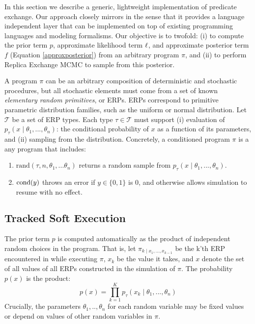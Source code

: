 
In this section we describe a generic, lightweight implementation of predicate exchange.
Our approach closely mirrors \citep{wingate2011lightweight, milch20071} in the sense that it provides a language independent layer that can be implemented on top of existing programming languages and modeling formalisms.
Our objective is to twofold: (i) to compute the prior term $p$, approximate likelihood term $\operatorname{\ell}$, and approximate posterior term $f$ (Equation \ref{approxposterior}) from an arbitrary program $\pi$, and (ii) to perform Replica Exchange MCMC to sample from this posterior.

A program $\pi$ can be an arbitrary composition of deterministic and stochastic procedures, but all stochastic elements must come from a set of known \emph{elementary random primitives}, or ERPs.
ERPs correspond to primitive parametric distribution families, such as the uniform or normal distribution.
Let $\mathcal{T}$ be a set of ERP types.
Each type $\tau \in \mathcal{T}$ must support (i) evaluation of $p_\tau(x \mid \theta_1, ..., \theta_n)$: the conditional probability of $x$ as a function of its parameters, and (ii) sampling from the distribution.
Concretely, a conditioned program $\pi$ is a any program that includes:

\begin{enumerate}
  \item $\textrm{rand}(\tau, n, \theta_1, ...\theta_n)$ returns a random sample from $p_\tau(x \mid \theta_1, ..., \theta_n)$.
  \item $\operatorname{cond}(y)$ throws an error if $y \in \{0, 1\}$ is 0, and otherwise allows simulation to resume with no effect.
\end{enumerate}



\subsection{Tracked Soft Execution}
The prior term $p$ is computed automatically as the product of independent random choices in the program. 
That is, let $\pi_{k \mid x_1, ..., x_{k-1}}$ be the k'th ERP encountered in while executing $\pi$, $x_k$ be the value it takes, and $x$ denote the set of all values of all ERPs constructed in the simulation of $\pi$.
The probability $p(x)$ is the product:
\begin{equation}\label{productprob}
p(x) = \prod_{k=1}^K p_\tau(x_k \mid \theta_1,..., \theta_n )
\end{equation}
Crucially, the parameters $\theta_1,..,\theta_n$ for each random variable may be fixed values or depend on values of other random variables in $\pi$.

